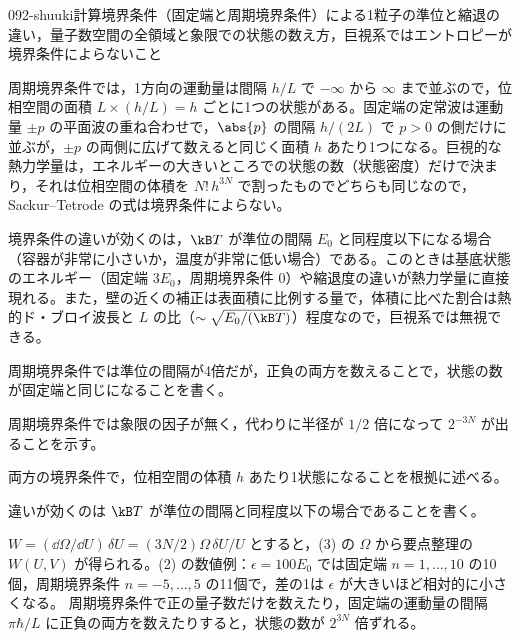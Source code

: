 \documentclass[uplatex,dvipdfmx,a4paper,11pt]{jsarticle}
\begin{document}
\begin{mondai}{092-shuuki}{計算}{境界条件（固定端と周期境界条件）による1粒子の準位と縮退の違い，量子数空間の全領域と象限での状態の数え方，巨視系ではエントロピーが境界条件によらないこと}
\begin{tadashii}
 周期境界条件では，1方向の運動量は間隔 $h/L$ で $-\infty$ から $\infty$ まで並ぶので，位相空間の面積 $L\times(h/L)=h$ ごとに1つの状態がある。固定端の定常波は運動量 $\pm p$ の平面波の重ね合わせで，$\abs{p}$ の間隔 $h/(2L)$ で $p>0$ の側だけに並ぶが，$\pm p$ の両側に広げて数えると同じく面積 $h$ あたり1つになる。巨視的な熱力学量は，エネルギーの大きいところでの状態の数（状態密度）だけで決まり，それは位相空間の体積を $N!\,h^{3N}$ で割ったものでどちらも同じなので，Sackur--Tetrode の式は境界条件によらない。

境界条件の違いが効くのは，$\kB T$ が準位の間隔 $E_{0}$ と同程度以下になる場合（容器が非常に小さいか，温度が非常に低い場合）である。このときは基底状態のエネルギー（固定端 $3E_{0}$，周期境界条件 $0$）や縮退度の違いが熱力学量に直接現れる。また，壁の近くの補正は表面積に比例する量で，体積に比べた割合は熱的ド・ブロイ波長と $L$ の比（$\sim\sqrt{E_{0}/(\kB T)}$）程度なので，巨視系では無視できる。
\begin{ronten}
  \item {} 周期境界条件では準位の間隔が4倍だが，正負の両方を数えることで，状態の数が固定端と同じになることを書く。
  \item {} 周期境界条件では象限の因子が無く，代わりに半径が $1/2$ 倍になって $2^{-3N}$ が出ることを示す。
  \item {} 両方の境界条件で，位相空間の体積 $h$ あたり1状態になることを根拠に述べる。
  \item {} 違いが効くのは $\kB T$ が準位の間隔と同程度以下の場合であることを書く。
\end{ronten}
\kenzan $W=(\dd \Omega/\dd U)\,\delta U=(3N/2)\Omega\,\delta U/U$ とすると，(3) の $\Omega$ から要点整理の $W(U,V)$ が得られる。(2) の数値例：$\epsilon=100E_{0}$ では固定端 $n=1,\dots,10$ の10個，周期境界条件 $n=-5,\dots,5$ の11個で，差の1は $\epsilon$ が大きいほど相対的に小さくなる。
\tsumazuki 周期境界条件で正の量子数だけを数えたり，固定端の運動量の間隔 $\pi\hbar/L$ に正負の両方を数えたりすると，状態の数が $2^{3N}$ 倍ずれる。
\end{tadashii}
\end{mondai}
\end{document}
